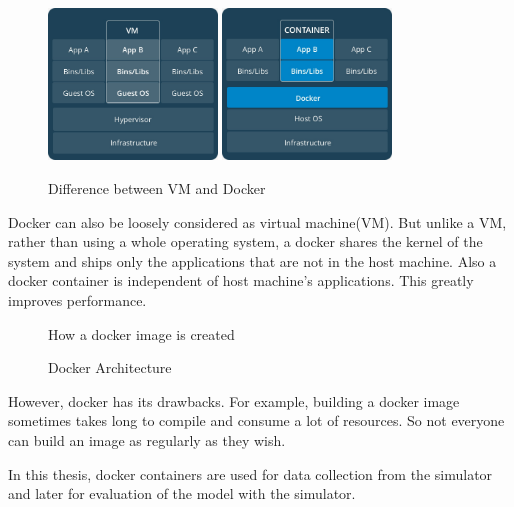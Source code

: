 \begin{figure}
    \centering
    {\includegraphics[width=0.4\textwidth]{figures/inkscape/VM.jpeg}}
    \quad
    {\includegraphics[width=0.4\textwidth ]{figures/inkscape/dockerarchi.jpeg}}
    \caption{Difference between VM and Docker}
    \label{fig:vmvsdocker}

\end{figure}

Docker can also be loosely considered as virtual machine(VM). But unlike a VM, rather than
using a whole operating system, a docker shares the kernel of the system and ships only
the applications that are not in the host machine. Also a docker container is independent
of host machine's applications. This greatly improves performance.

\begin{figure}[h]
    \centering
    \def\svgwidth{0.7\textwidth}
    
    \caption{How a docker image is created}
    \label{fig:dockerimage}
\end{figure}
\newpage
\begin{figure}[h]
    \centering
    \def\svgwidth{0.9\textwidth}
    
    \caption{Docker Architecture}
    \label{fig:dockerarchitecure}
\end{figure}

However, docker has its drawbacks. For example, building a docker image sometimes takes
long to compile and consume a lot of resources. So not everyone can build an image as
regularly as they wish.

In this thesis, docker containers are used for data collection from the simulator and later
for evaluation of the model with the simulator.


